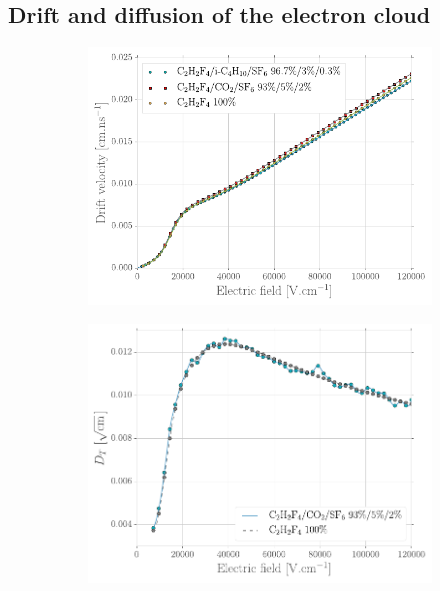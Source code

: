 \newpage
		
	\subsection{Drift and diffusion of the electron cloud}
	\label{chapt3:ssec:electrons}
	
\begingroup\setlength{\intextsep}{0pt}\setlength{\columnsep}{15pt}
	
	\begin{figure}
		\begin{subfigure}{\linewidth}
			\centering
			\includegraphics[width = \linewidth]{fig/chapt3/Drift_velocity.pdf}
			\caption{\label{fig:Drift-Diff:A}}
		\end{subfigure}
		\begin{subfigure}{\linewidth}
			\centering
			\includegraphics[width = \linewidth]{fig/chapt3/Diff_Trans.pdf}

\end{subfigure}
\end{figure}
